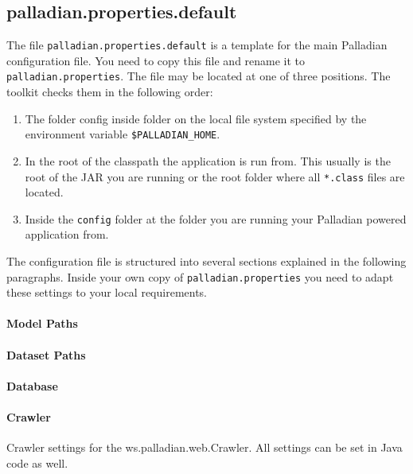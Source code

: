 \subsection{palladian.properties.default}
\label{sec:palladian.properties.default}
The file \texttt{palladian.properties.default} is a template for the main Palladian configuration file. You need to copy this file and rename it to \texttt{palladian.properties}. The file may be located at one of three positions. The toolkit checks them in the following order:
\begin{enumerate}
\item The folder config inside folder on the local file system specified by the environment variable \texttt{\$PALLADIAN\_HOME}.
\item In the root of the classpath the application is run from. This usually is the root of the JAR you are running or the root folder where all \texttt{*.class} files are located.
\item Inside the \texttt{config} folder at the folder you are running your Palladian powered application from.
\end{enumerate}

The configuration file is structured into several sections explained in the following paragraphs. Inside your own copy of \texttt{palladian.properties} you need to adapt these settings to your local requirements.

\paragraph{Model Paths}
\label{par:modelpaths}

\paragraph{Dataset Paths}
\label{par:datasetpaths}

\paragraph{Database}
\label{par:database}

\paragraph{Crawler}
\label{sec:crawler.conf}
Crawler settings for the ws.palladian.web.Crawler. All settings can be set in Java code as well.

